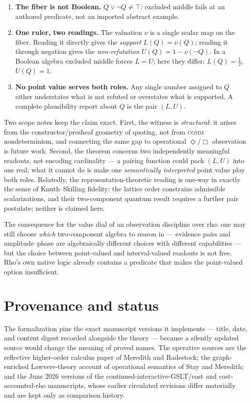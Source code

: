 \documentclass[11pt]{article}
\begin{document}
\begin{enumerate}
\item \textbf{The fiber is not Boolean.}  $Q \lor \lnot Q \ne \top$:
  excluded middle fails at an authored predicate, not an imported
  abstract example.
\item \textbf{One ruler, two readings.}  The valuation $\nu$ is a
  single scalar map on the fiber.  Reading it directly gives the
  \emph{support} $L(Q)=\nu(Q)$; reading it through negation gives the
  \emph{non-refutation} $U(Q)=1-\nu(\lnot Q)$.  In a Boolean algebra
  excluded middle forces $L=U$; here they differ: $L(Q)=\tfrac12$,
  $U(Q)=1$.
\item \textbf{No point value serves both roles.}  Any single number
  assigned to $Q$ either understates what is not refuted or overstates
  what is supported.  A complete plausibility report about $Q$ is the
  pair $(L,U)$.
\end{enumerate}

Two scope notes keep the claim exact.  First, the witness is
\emph{structural}: it arises from the constructor/presheaf geometry of
quoting, not from \textsc{comm} nondeterminism, and connecting the same
gap to operational $\Diamond/\Box$ observation is future work.  Second,
the theorem concerns two independently meaningful readouts, not encoding
cardinality --- a pairing function could pack $(L,U)$ into one real; what
it cannot do is make one \emph{semantically interpreted} point value
play both roles.  Relatedly, the representation-theoretic reading is
one-way in exactly the sense of Knuth--Skilling fidelity: the lattice
order constrains admissible scalarizations, and their two-component
quantum result requires a further pair postulate; neither is claimed
here.

The consequence for the value dial of an observation discipline over
rho: one may still choose \emph{which} two-component algebra to reason
in --- evidence pairs and amplitude--phase are algebraically different
choices with different capabilities --- but the choice between
point-valued and interval-valued readouts is not free.  Rho's own native
logic already contains a predicate that makes the point-valued option
insufficient.

\section{Provenance and status}

The formalization pins the exact manuscript versions it implements ---
title, date, and content digest recorded alongside the theory --- because
a silently updated source would change the meaning of proved names. The
operative sources are the reflective higher-order calculus paper of
Meredith and Radestock; the graph-enriched Lawvere-theory account of
operational semantics of Stay and Meredith; and the June 2026 versions of
the continued-interactive-GSLT/cost and cost-accounted-rho manuscripts,
whose earlier circulated revisions differ materially and are kept only as
comparison history.
\end{document}
